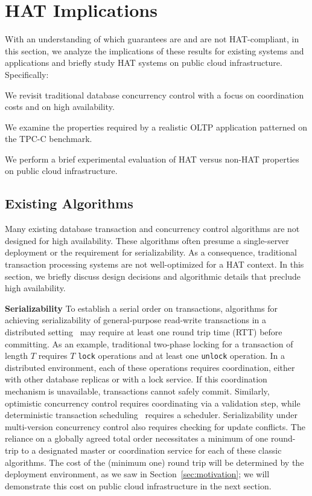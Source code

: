 
\section{HAT Implications}
\label{sec:evaluation}

With an understanding of which guarantees are and are not
HAT-compliant, in this section, we analyze the implications of these
results for existing systems and applications and briefly study HAT
systems on public cloud infrastructure. Specifically:

\begin{myenumerate}
\item We revisit traditional database concurrency control with a focus
  on coordination costs and on high availability.
\item We examine the properties required by a realistic OLTP
  application patterned on the TPC-C benchmark.
\item We perform a brief experimental evaluation of HAT versus non-HAT
  properties on public cloud infrastructure.
\end{myenumerate}

\subsection{Existing Algorithms}

Many existing database transaction and concurrency control algorithms
are not designed for high availability. These algorithms often presume
a single-server deployment or the requirement for serializability. As
a consequence, traditional transaction processing systems are not
well-optimized for a HAT context. In this section, we briefly discuss
design decisions and algorithmic details that preclude high
availability.

\vspace{.5em}\noindent\textbf{Serializability} To establish a serial
order on transactions, algorithms for achieving serializability of
general-purpose read-write transactions in a distributed
setting~\cite{bernstein-book} may require at least one round trip time
(RTT) before committing. As an example, traditional two-phase locking
for a transaction of length $T$ requires $T$ \texttt{lock} operations
and at least one \texttt{unlock} operation.  In a distributed
environment, each of these operations requires coordination, either
with other database replicas or with a lock service. If this
coordination mechanism is unavailable, transactions cannot safely
commit. Similarly, optimistic concurrency control requires
coordinating via a validation step, while deterministic transaction
scheduling~\cite{deterministic-scheduling} requires a
scheduler. Serializability under multi-version concurrency control
also requires checking for update conflicts. The reliance on a
globally agreed total order necessitates a minimum of one round-trip
to a designated master or coordination service for each of these
classic algorithms.  The cost of the (minimum one) round trip will be
determined by the deployment environment, as we saw in
Section~\ref{sec:motivation}; we will demonstrate this cost on public
cloud infrastructure in the next section.

